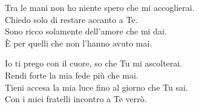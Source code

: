 
\strofa Tra le mani non ho niente spero che mi accoglierai.\\
Chiedo solo di restare accanto a Te.\\
Sono ricco solamente dell'amore che mi dai.\\
È per quelli che non l'hanno avuto mai.

\spazio


\spazio

\strofa Io ti prego con il cuore, so che Tu mi ascolterai.\\
Rendi forte la mia fede più che mai.\\
Tieni accesa la mia luce fino al giorno che Tu sai.\\
Con i miei fratelli incontro a Te verrò.

\spazio

